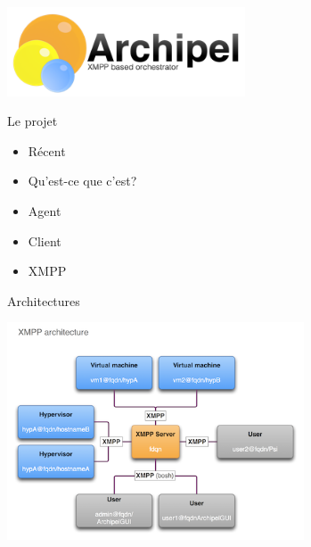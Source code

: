 

%
\begin{frame}
  \begin{center}
   \includegraphics[width=200pt]{images_presentation/logo_archipel.png}
  \end{center}
\end{frame}

\begin{frame}{Le projet}
\begin{center}
  \begin{itemize}
    \item Récent
\pause
    \item Qu'est-ce que c'est?
\pause
    \item Agent
\pause
    \item Client
\pause
    \item XMPP
  \end{itemize}
\end{center}
\end{frame}


\begin{frame}{Architectures}
\begin{center}
  \includegraphics[width=250pt]{images_presentation/archipel.png}
\end{center}
\end{frame}

